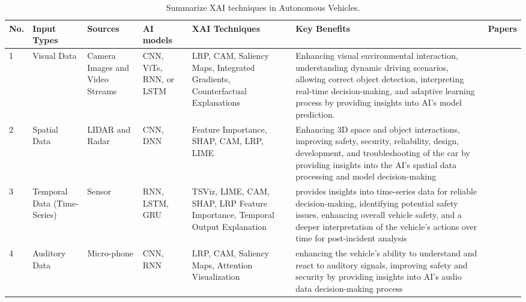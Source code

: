 \documentclass[final,5p,times,twocolumn]{elsarticle}
\begin{document}
\begin{table}[!h]
  \begin{center}
    \caption{Summarize XAI techniques in Autonomous Vehicles.} \label{AutoCarSumXAItechniques} 
    
    \begin{tabular}{m{10pt}|m{55pt}|m{40pt}|m{40pt}|m{65pt}|m{170pt}|m{25pt}} \hline
        \textbf{No.} & \textbf{Input Types}&\textbf{Sources}&\textbf{AI \newline models}& \textbf{XAI \newline Techniques} & \textbf{Key Benefits} &\textbf{Papers} \\ \hline 
        1 & Visual Data  & Camera Images and Video Streams & CNN, ViTs, RNN, or LSTM & LRP, CAM, Saliency Maps, Integrated Gradients, Counterfactual Explanations & Enhancing visual environmental interaction, understanding dynamic driving scenarios, allowing correct object detection, interpreting real-time decision-making, and adaptive learning process by providing insights into AI’s model prediction. & \cite{mankodiya2022od, karim2022toward} \\ \hline 
        
        2 & Spatial Data  & LIDAR and Radar & CNN, DNN & Feature Importance, SHAP, CAM, LRP, LIME & Enhancing 3D space and object interactions, improving safety, security, reliability, design, development, and troubleshooting of the car by providing insights into the AI's spatial data processing and model decision-making & \cite{madhav2022explainable, onyekpe2022explainable} \\ \hline 
        
        3 & Temporal Data (Time-Series) & Sensor & RNN, LSTM, GRU & TSViz, LIME, CAM, SHAP, LRP Feature Importance, Temporal Output Explanation & provides insights into time-series data for reliable decision-making, identifying potential safety issues, enhancing overall vehicle safety, and a deeper interpretation of the vehicle's actions over time for post-incident analysis & \cite{cheng2021method, rojat2021explainable}\\ \hline 
        
        4 & Auditory Data  & Micro-\newline phone  & CNN, RNN & LRP, CAM, Saliency Maps, Attention Visualization & enhancing the vehicle's ability to understand and react to auditory signals, improving safety and security by providing insights into AI's audio data decision-making process & \cite{atakishiyev2021explainable} \\ \hline 
        

\end{tabular}
\end{center}
\end{table}
\end{document}
